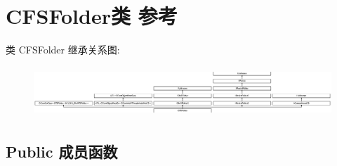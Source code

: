 \hypertarget{class_c_f_s_folder}{}\section{C\+F\+S\+Folder类 参考}
\label{class_c_f_s_folder}
类 C\+F\+S\+Folder 继承关系图\+:\begin{figure}[H]
\begin{center}
\leavevmode
\includegraphics[height=1.909091cm]{class_c_f_s_folder}
\end{center}
\end{figure}
\subsection*{Public 成员函数}
